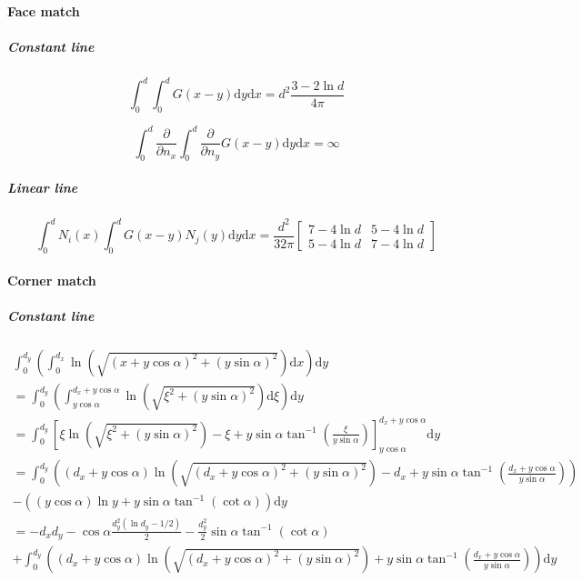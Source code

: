 \documentclass[a4paper,11pt]{article}
\newcommand{\td}{\mathrm{d}}
\begin{document}
\paragraph{Face match}

\subparagraph{Constant line}

\begin{equation}
\int_{0}^{d} \int_{0}^{d} G(x-y) \td y \td x
=
d^2\frac{3-2\ln d}{4\pi}
\end{equation}

\begin{equation}
\int_{0}^{d} \frac{\partial}{\partial n_x} \int_{0}^{d} \frac{\partial}{\partial n_y} G(x-y) \td y \td x
=
\infty
\end{equation}

\subparagraph{Linear line}

\begin{equation}
\int_{0}^{d} N_i(x) \int_{0}^{d} G(x-y) N_j(y) \td y \td x
=
\frac{d^2}{32\pi} \begin{bmatrix}
7-4 \ln d & 5 - 4 \ln d \\
5-4 \ln d & 7 - 4 \ln d
\end{bmatrix}
\end{equation}

\paragraph{Corner match}

\subparagraph{Constant line}

\begin{multline}
\int_{0}^{d_y}
\left(
\int_{0}^{d_x} \ln \left(\sqrt{(x+y\cos\alpha)^2+(y\sin\alpha)^2}\right)
\td x \right)
\td y \\
=
\int_{0}^{d_y}
\left(
\int_{y\cos\alpha}^{d_x+y\cos\alpha} \ln \left(\sqrt{\xi^2+(y\sin\alpha)^2}\right)
\td \xi \right)
\td y \\
=
\int_{0}^{d_y}
\left[
\xi \ln \left(\sqrt{\xi^2+(y\sin\alpha)^2}\right) - \xi + y\sin\alpha \tan^{-1} \left(\frac{\xi}{y\sin\alpha}\right)
\right]_{y\cos\alpha}^{d_x+y\cos\alpha} 
\td y \\
=
\int_{0}^{d_y}
\left(
\left(d_x+y\cos\alpha\right) \ln \left(\sqrt{\left(d_x+y\cos\alpha\right)^2+(y\sin\alpha)^2}\right) - d_x + y\sin\alpha \tan^{-1} \left(\frac{d_x+y\cos\alpha}{y\sin\alpha}\right)
\right) \\
-
\left(
\left(y\cos\alpha\right) \ln y + y\sin\alpha \tan^{-1} \left(\cot\alpha\right)
\right)
\td y \\
=
-d_x d_y - \cos\alpha \frac{d_y^2 \left(\ln d_y - 1/2\right)}{2}
-
\frac{d_y^2}{2}\sin\alpha \tan^{-1} \left(\cot\alpha\right) \\
+
\int_{0}^{d_y}
\left(
\left(d_x+y\cos\alpha\right) \ln \left(\sqrt{\left(d_x+y\cos\alpha\right)^2+(y\sin\alpha)^2}\right) + y\sin\alpha \tan^{-1} \left(\frac{d_x+y\cos\alpha}{y\sin\alpha}\right)
\right)
\td y
\end{multline}
\end{document}
